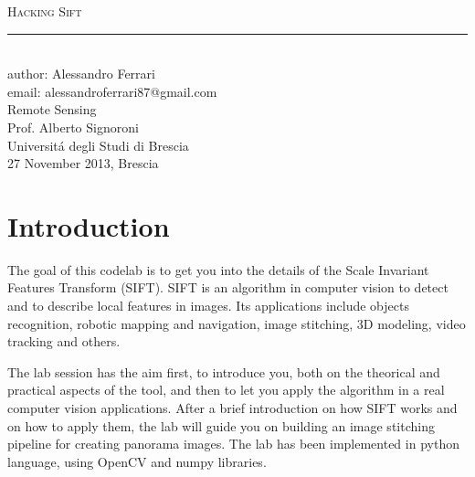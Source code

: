 \documentclass[aps,letterpaper,10pt]{revtex4}
\makeatletter
\newcommand{\labtitle}{Hacking Sift}
\newcommand{\authorname}{Alessandro Ferrari}
\newcommand{\emailauthor}{alessandroferrari87@gmail.com}
\newcommand{\classno}{Remote Sensing}
\newcommand{\professor}{Prof. Alberto Signoroni}
\newcommand{\university}{Universit\'a degli Studi di Brescia}
\newcommand{\presentationdate}{27 November 2013, Brescia}
\makeatother
\begin{document}


\begin{titlepage}
\begin{center}
{\Large \textsc{\labtitle} \\ \vspace{4pt}} 
\rule[13pt]{\textwidth}{1pt} \\ \vspace{150pt}
{\large author: \authorname \\ \vspace{10pt}
email: \emailauthor \\ \vspace{10pt}
\classno \\ \professor \\ \university \\ \vspace{10pt}
\presentationdate}
\end{center}
\end{titlepage}





\section{Introduction}
The goal of this codelab is to get you into the details of the Scale Invariant Features Transform (SIFT). SIFT is an algorithm in computer vision to detect and to describe local features in images. Its applications include objects recognition, robotic mapping and navigation, image stitching, 3D modeling, video tracking and others. \vspace{3mm}

The lab session has the aim first, to introduce you, both on the theorical and practical aspects of the tool, and then to let you apply the algorithm in a real computer vision applications. After a brief introduction on how SIFT works and on how to apply them, the lab will guide you on building an image stitching pipeline for creating panorama images. The lab has been implemented in python language, using OpenCV and numpy libraries. \vspace{3mm} %
\end{document}
